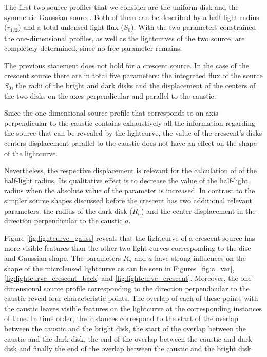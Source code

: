 \documentclass[usenatbib]{mn2e}
\begin{document}
The first two source profiles that we consider are the uniform disk and the symmetric Gaussian source. 
Both of them can be described by a half-light radius ($r_{1/2}$) and a total unlensed light flux ($S_0$). 
With the two parameters constrained the one-dimensional profiles, as well as the lightcurves of the 
two source, are completely determined, since no free parameter remains. 

The previous statement does not hold for a crescent source.
In the case of the crescent source there are in total five parameters: the integrated flux of the source $S_0$,
 the radii of the bright and dark disks and the displacement of the centers of the two disks on the axes perpendicular and parallel to the caustic. 


Since the one-dimensional source profile that corresponds to an 
axis perpendicular to the caustic contains exhaustively all the 
information regarding the source that can be revealed by the lightcurve, 
the value of the crescent's disks centers displacement parallel to the caustic 
does not have an effect on the shape of the lightcurve. 

Nevertheless, the respective displacement is relevant for the calculation of
of the half-light radius.  Its qualitative effect is to 
decrease the value of the
half-light radius when the absolute value of the parameter is
increased.  In contrast to the simpler source shapes discussed before the
crescent has two additional relevant parameters: the radius of the dark 
disk ($R_n$) and the center displacement in the direction
 perpendicular to the caustic $a$.

Figure \ref{fig:lightcurve_gauss} reveals that the lightcurve of a crescent source has more
visible features than the other two light-curves corresponding to the
disc and Gaussian shape. The parameters $R_n$ and $a$ have strong
influences on the shape of the microlensed lightcurve as can be seen
in Figures~\ref{fig:a_var}, \ref{fig:lightcurve_crescent_back} and
\ref{fig:lightcurve_crescent}.  Moreover, the one-dimensional
source profile corresponding to the direction perpendicular to the
caustic reveal four characteristic points. The overlap of each of
these points with the caustic leaves visible features on the
lightcurve at the corresponding instances of time. In time order,
the instances correspond to the start of the overlap between the
caustic and the bright disk, the start of the overlap between the
caustic and the dark disk, the end of the overlap between the caustic
and dark disk and finally the end of the overlap between the caustic
and the bright disk.
\end{document}
